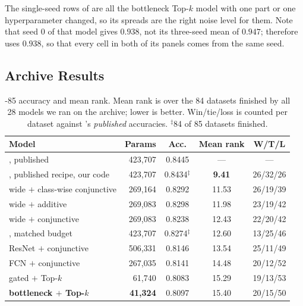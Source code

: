 The single-seed rows of  are all the bottleneck \mbox{Top-$k$} model with one part
or one hyperparameter changed, so its spreads are the right noise level for them. Note that seed 0 of
that model gives $0.938$, not its three-seed mean of $0.947$;  therefore uses
$0.938$, so that every cell in both of its panels comes from the same seed.

\subsection{\ucr{} Archive Results}
\label{app:ucr}

\begin{table}[h]
\caption{\ucr{}-85 accuracy and mean rank. Mean rank is over the 84 datasets finished by all 28
models we ran on the archive; lower is better. Win/tie/loss is counted per dataset against
\millet{}'s \emph{published} accuracies. $^{\ddagger}$84 of 85 datasets finished.}
\label{tab:app_ucr}
\begin{center}
\footnotesize
\setlength{\tabcolsep}{5pt}
\begin{tabular}{lrccc}
\toprule
\textbf{Model} & Params & Acc. & Mean rank & W/T/L \\
\midrule
\millet{}, published \citep{early2024millet}   & 423{,}707 & 0.8445 & --- & --- \\
\millet{}, published recipe, our code          & 423{,}707 & 0.8434$^{\ddagger}$ & \textbf{9.41} & 26/32/26 \\
\seanet{} wide $+$ class-wise conjunctive      & 269{,}164 & 0.8292 & 11.53 & 26/19/39 \\
\seanet{} wide $+$ \millet{} additive          & 269{,}083 & 0.8298 & 11.98 & 23/19/42 \\
\seanet{} wide $+$ \millet{} conjunctive       & 269{,}083 & 0.8238 & 12.43 & 22/20/42 \\
\millet{}, matched budget                      & 423{,}707 & 0.8274$^{\ddagger}$ & 12.60 & 13/25/46 \\
ResNet $+$ conjunctive                         & 506{,}331 & 0.8146 & 13.54 & 25/11/49 \\
FCN $+$ conjunctive                            & 267{,}035 & 0.8141 & 14.48 & 20/12/52 \\
\seanet{} gated $+$ Top-$k$                    &  61{,}740 & 0.8083 & 15.29 & 19/13/53 \\
\textbf{\seanet{} bottleneck $+$ Top-$k$}      & \textbf{41{,}324} & 0.8097 & 15.40 & 20/15/50 \\
\bottomrule
\end{tabular}
\end{center}
\end{table}

